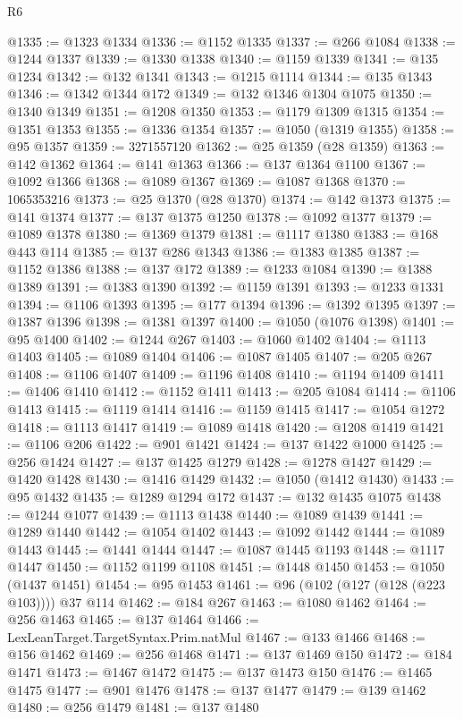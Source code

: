 \begin{lexlean}{R6}
\begin{coremodule}
@1335 := @1323 @1334
@1336 := @1152 @1335
@1337 := @266 @1084
@1338 := @1244 @1337
@1339 := @1330 @1338
@1340 := @1159 @1339
@1341 := @135 @1234
@1342 := @132 @1341
@1343 := @1215 @1114
@1344 := @135 @1343
@1346 := @1342 @1344 @172
@1349 := @132 @1346 @1304 @1075
@1350 := @1340 @1349
@1351 := @1208 @1350
@1353 := @1179 @1309 @1315
@1354 := @1351 @1353
@1355 := @1336 @1354
@1357 := @1050 (@1319 @1355)
@1358 := @95 @1357
@1359 := 3271557120
@1362 := @25 @1359 (@28 @1359)
@1363 := @142 @1362
@1364 := @141 @1363
@1366 := @137 @1364 @1100
@1367 := @1092 @1366
@1368 := @1089 @1367
@1369 := @1087 @1368
@1370 := 1065353216
@1373 := @25 @1370 (@28 @1370)
@1374 := @142 @1373
@1375 := @141 @1374
@1377 := @137 @1375 @1250
@1378 := @1092 @1377
@1379 := @1089 @1378
@1380 := @1369 @1379
@1381 := @1117 @1380
@1383 := @168 @443 @114
@1385 := @137 @286 @1343
@1386 := @1383 @1385
@1387 := @1152 @1386
@1388 := @137 @172
@1389 := @1233 @1084
@1390 := @1388 @1389
@1391 := @1383 @1390
@1392 := @1159 @1391
@1393 := @1233 @1331
@1394 := @1106 @1393
@1395 := @177 @1394
@1396 := @1392 @1395
@1397 := @1387 @1396
@1398 := @1381 @1397
@1400 := @1050 (@1076 @1398)
@1401 := @95 @1400
@1402 := @1244 @267
@1403 := @1060 @1402
@1404 := @1113 @1403
@1405 := @1089 @1404
@1406 := @1087 @1405
@1407 := @205 @267
@1408 := @1106 @1407
@1409 := @1196 @1408
@1410 := @1194 @1409
@1411 := @1406 @1410
@1412 := @1152 @1411
@1413 := @205 @1084
@1414 := @1106 @1413
@1415 := @1119 @1414
@1416 := @1159 @1415
@1417 := @1054 @1272
@1418 := @1113 @1417
@1419 := @1089 @1418
@1420 := @1208 @1419
@1421 := @1106 @206
@1422 := @901 @1421
@1424 := @137 @1422 @1000
@1425 := @256 @1424
@1427 := @137 @1425 @1279
@1428 := @1278 @1427
@1429 := @1420 @1428
@1430 := @1416 @1429
@1432 := @1050 (@1412 @1430)
@1433 := @95 @1432
@1435 := @1289 @1294 @172
@1437 := @132 @1435 @1075
@1438 := @1244 @1077
@1439 := @1113 @1438
@1440 := @1089 @1439
@1441 := @1289 @1440
@1442 := @1054 @1402
@1443 := @1092 @1442
@1444 := @1089 @1443
@1445 := @1441 @1444
@1447 := @1087 @1445 @1193
@1448 := @1117 @1447
@1450 := @1152 @1199 @1108
@1451 := @1448 @1450
@1453 := @1050 (@1437 @1451)
@1454 := @95 @1453
@1461 := @96 (@102 (@127 (@128 (@223 @103)))) @37 @114
@1462 := @184 @267
@1463 := @1080 @1462
@1464 := @256 @1463
@1465 := @137 @1464
@1466 := LexLeanTarget.TargetSyntax.Prim.natMul
@1467 := @133 @1466
@1468 := @156 @1462
@1469 := @256 @1468
@1471 := @137 @1469 @150
@1472 := @184 @1471
@1473 := @1467 @1472
@1475 := @137 @1473 @150
@1476 := @1465 @1475
@1477 := @901 @1476
@1478 := @137 @1477
@1479 := @139 @1462
@1480 := @256 @1479
@1481 := @137 @1480

\end{coremodule}
\end{lexlean}
